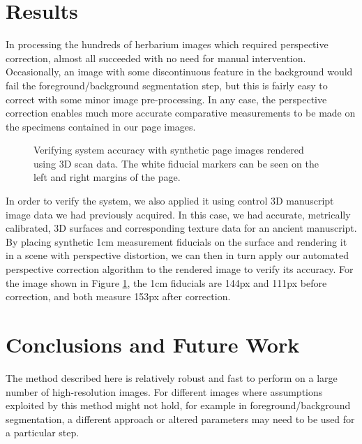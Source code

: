 \documentclass[runningheads,a4paper]{llncs}
\begin{document}
\section{Results}

In processing the hundreds of herbarium images which required perspective correction, almost all succeeded
with no need for manual intervention. Occasionally, an image with some discontinuous feature in the background
would fail the foreground/background segmentation step, but this is fairly easy to correct with some minor
image pre-processing. In any case, the perspective correction enables much more accurate comparative measurements
to be made on the specimens contained in our page images.

\begin{figure}[h!tbm]
  \centering

  
  \caption{Verifying system accuracy with synthetic page images rendered using 3D scan data. The white fiducial markers can be seen on the left and right margins of the page.}\label{fig:synthetic}
\end{figure}

In order to verify the system, we also applied it using control 3D manuscript image data we had previously acquired.
In this case, we had accurate, metrically calibrated, 3D surfaces and corresponding texture data for an ancient manuscript. By placing synthetic 1cm measurement fiducials on the surface and rendering it in a scene with perspective distortion,
we can then in turn apply our automated perspective correction algorithm to the rendered image to verify its accuracy. For the image shown in Figure \ref{fig:synthetic}, the 1cm fiducials are 144px and 111px before correction, and both measure 153px after correction.

\section{Conclusions and Future Work}

The method described here is relatively robust and fast to perform on a large number of high-resolution images.
For different images where assumptions exploited by this method might not hold, for example in 
foreground/background segmentation, a different approach or altered parameters
may need to be used for a particular step.
\end{document}
